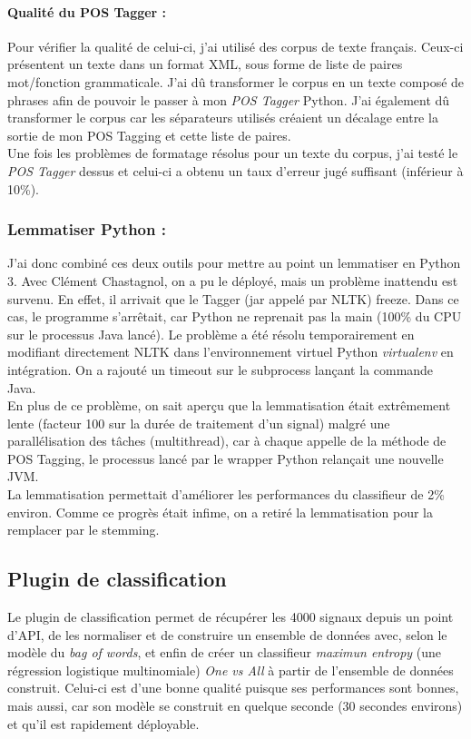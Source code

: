             \paragraph{Qualité du POS Tagger :}
                Pour vérifier la qualité de celui-ci, j'ai utilisé des corpus de texte français. Ceux-ci présentent un texte dans un format XML, sous forme de liste de paires mot/fonction grammaticale. J'ai dû transformer le corpus en un texte composé de phrases afin de pouvoir le passer à mon \textit{POS Tagger} Python. J'ai également dû transformer le corpus car les séparateurs utilisés créaient un décalage entre la sortie de mon POS Tagging et cette liste de paires.\\
                Une fois les problèmes de formatage résolus pour un texte du corpus, j'ai testé le \textit{POS Tagger} dessus et celui-ci a obtenu un taux d'erreur jugé suffisant (inférieur à 10\%).

        \subsubsection{Lemmatiser Python :}
            J'ai donc combiné ces deux outils pour mettre au point un lemmatiser en Python 3. Avec Clément Chastagnol, on a pu le déployé, mais un problème inattendu est survenu. En effet, il arrivait que le Tagger (jar appelé par NLTK) freeze. Dans ce cas, le programme s'arrêtait, car Python ne reprenait pas la main (100\% du CPU sur le processus Java lancé). Le problème a été résolu temporairement en modifiant directement NLTK dans l'environnement virtuel Python \textit{virtualenv} en intégration. On a rajouté un timeout sur le subprocess lançant la commande Java.\\

            En plus de ce problème, on sait aperçu que la lemmatisation était extrêmement lente (facteur 100 sur la durée de traitement d'un signal) malgré une parallélisation des tâches (multithread), car à chaque appelle de la méthode de POS Tagging, le processus lancé par le wrapper Python relançait une nouvelle JVM.\\

            La lemmatisation permettait d'améliorer les performances du classifieur de 2\% environ. Comme ce progrès était infime, on a retiré la lemmatisation pour la remplacer par le stemming.


    \subsection{Plugin de classification}
        Le plugin de classification permet de récupérer les 4000 signaux depuis un point d'API, de les normaliser et de construire un ensemble de données avec, selon le modèle du \textit{bag of words}, et enfin de créer un classifieur \textit{maximun entropy} (une régression logistique multinomiale) \textit{One vs All} à partir de l'ensemble de données construit. Celui-ci est d'une bonne qualité puisque ses performances sont bonnes, mais aussi, car son modèle se construit en quelque seconde (30 secondes environs) et qu'il est rapidement déployable.\\

